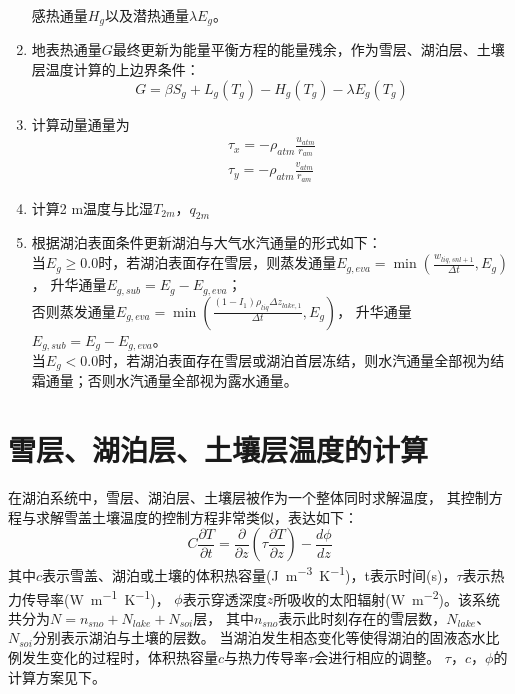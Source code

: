 \begin{enumerate}
    感热通量$H_g$以及潜热通量$\lambda E_g$。
    \item 地表热通量$G$最终更新为能量平衡方程的能量残余，作为雪层、湖泊层、土壤层温度计算的上边界条件：
    \begin{equation}
    G=\beta S_{g}+L_{g}\left(T_{g}\right)-H_{g}\left(T_{g}\right)-\lambda E_{g}\left(T_{g}\right)
    \end{equation}
    \item 计算动量通量为
    \begin{equation}
    \begin{array}{c}\tau_{x}=-\rho_{atm} \frac{u_{atm}}{r_{am}} \\ \tau_{y}=-\rho_{atm} \frac{v_{atm}}{r_{am}}\end{array}
    \end{equation}
    \item 计算2 m温度与比湿$T_{2m}$，$q_{2m}$
    \item 根据湖泊表面条件更新湖泊与大气水汽通量的形式如下：\\
    当$E_g\geq0.0$时，若湖泊表面存在雪层，则蒸发通量$E_{g,eva}=\min \left(\frac{w_{liq, s n l+1}}{\Delta t}, E_{g}\right)$，
    升华通量$E_{g,sub}=E_{g}-E_{g,eva}$；\\
    否则蒸发通量$E_{g,eva}=\min \left(\frac{\left(1-I_{1}\right) \rho_{liq} \Delta z_{lake, 1}}{\Delta t}, E_{g}\right)$，
    升华通量$E_{g,sub}=E_{g}-E_{g,eva}$。\\
    当$E_g<0.0$时，若湖泊表面存在雪层或湖泊首层冻结，则水汽通量全部视为结霜通量；否则水汽通量全部视为露水通量。
    
\end{enumerate}

\section{雪层、湖泊层、土壤层温度的计算}\label{雪层湖泊层土壤层温度的计算}
在湖泊系统中，雪层、湖泊层、土壤层被作为一个整体同时求解温度，
其控制方程与求解雪盖土壤温度的控制方程非常类似，表达如下：
\begin{equation}
C \frac{\partial T}{\partial t}=\frac{\partial}{\partial z}\left(\tau \frac{\partial T}{\partial z}\right)-\frac{d \phi}{d z}
\end{equation}
其中$c$表示雪盖、湖泊或土壤的体积热容量(\unit{J.m^{-3}.K^{-1}})，t表示时间(s)，$\tau$表示热力传导率(\unit{W.m^{-1}.K^{-1}})，
$\phi$表示穿透深度$z$所吸收的太阳辐射(\unit{W.m^{-2}})。该系统共分为$N=n_{sno}+N_{lake}+N_{soi}$层，
其中$n_{sno}$表示此时刻存在的雪层数，$N_{lake}$、$N_{soi}$分别表示湖泊与土壤的层数。
当湖泊发生相态变化等使得湖泊的固液态水比例发生变化的过程时，体积热容量$c$与热力传导率$\tau$会进行相应的调整。
$\tau$，$c$，$\phi$的计算方案见下。


